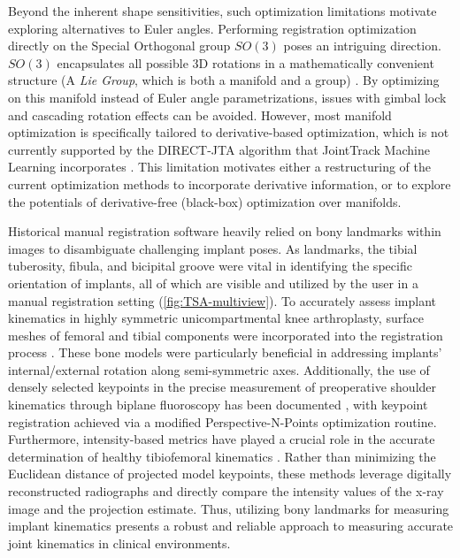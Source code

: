 Beyond the inherent shape sensitivities, such optimization limitations motivate exploring alternatives to Euler angles.
Performing registration optimization directly on the Special Orthogonal group $SO(3)$ poses an intriguing direction.
$SO(3)$ encapsulates all possible 3D rotations in a mathematically convenient structure (A \emph{Lie Group}, which is both a manifold and a group) \cite{zillerLieGroupsRepresentation2010,serreLieAlgebrasLie1992}.
By optimizing on this manifold instead of Euler angle parametrizations, issues with gimbal lock and cascading rotation effects can be avoided.
However, most manifold optimization is specifically tailored to derivative-based optimization, which is not currently supported by the DIRECT-JTA algorithm that JointTrack Machine Learning incorporates \cite{jensenJointTrackMachine2023,jonesLipschitzianOptimizationLipschitz1993,floodAutomatedRegistration3D2018}.
This limitation motivates either a restructuring of the current optimization methods to incorporate derivative information, or to explore the potentials of derivative-free (black-box) optimization \cite{audetDerivativeFreeBlackboxOptimization2017} over manifolds.


Historical manual registration software heavily relied on bony landmarks within images to disambiguate challenging implant poses.
As landmarks, the tibial tuberosity, fibula, and bicipital groove were vital in identifying the specific orientation of implants, all of which are visible and utilized by the user in a manual registration setting (\cref{fig:TSA-multiview}).
To accurately assess implant kinematics in highly symmetric unicompartmental knee arthroplasty, surface meshes of femoral and tibial components were incorporated into the registration process \cite{banksComparingVivoKinematics2005}.
These bone models were particularly beneficial in addressing implants' internal/external rotation along semi-symmetric axes.
Additionally, the use of densely selected keypoints in the precise measurement of preoperative shoulder kinematics through biplane fluoroscopy has been documented \cite{burtonFullyAutomaticTracking2023}, with keypoint registration achieved via a modified Perspective-N-Points optimization routine.
Furthermore, intensity-based metrics have played a crucial role in the accurate determination of healthy tibiofemoral kinematics \cite{bakaStatisticalShapeModelBased2012}.
Rather than minimizing the Euclidean distance of projected model keypoints, these methods leverage digitally reconstructed radiographs and directly compare the intensity values of the x-ray image and the projection estimate.
Thus, utilizing bony landmarks for measuring implant kinematics presents a robust and reliable approach to measuring accurate joint kinematics in clinical environments.



